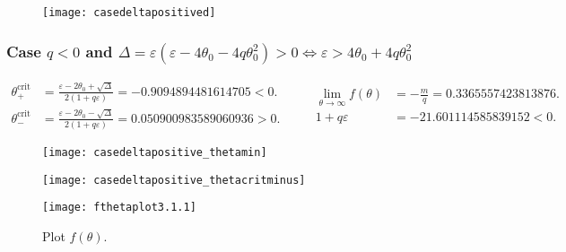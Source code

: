 \documentclass[
    8pt,
    aspectratio=1610,
    c,
    intlimits,
    leqno,
    professionalfonts,
]{beamer}
\begin{document}
\begin{frame}
	\begin{figure}[ht!]
		\centering
		\texttt{[image: casedeltapositived]}
	\end{figure}
\end{frame}

\begin{frame}
	\frametitle{Case $q<0$ and
		\begin{math}
			\Delta=
			\varepsilon\left(\varepsilon-4\theta_{0}-4q\theta^{2}_{0}\right)>
			0\iff\varepsilon>4\theta_{0}+4q\theta^{2}_{0}
		\end{math}
	}

	\begin{equation*}
		\begin{aligned}
			\theta^{\text{crit}}_{+} & =
			\frac{
				\varepsilon-2\theta_{0}+\sqrt{\Delta}
			}{
				2\left(1+q\varepsilon\right)
			}=
			-0.9094894481614705<
			0.                           \\
			\theta^{\text{crit}}_{-} & =
			\frac{
				\varepsilon-2\theta_{0}-\sqrt{\Delta}
			}{
				2\left(1+q\varepsilon\right)
			}=
			0.050900983589060936
			>0.
		\end{aligned}\qquad
		\begin{aligned}
			\lim_{\theta\to\infty}f\left(\theta\right) & =
			-\frac{m}{q}=
			0.3365557423813876.                            \\
			1+q\varepsilon                             & =
			-21.601114585839152<0.
		\end{aligned}
	\end{equation*}
\end{frame}

\begin{frame}
	\begin{figure}[ht!]
		\centering
		\texttt{[image: casedeltapositive\_thetamin]}
	\end{figure}
\end{frame}

\begin{frame}
	\begin{figure}[ht!]
		\centering
		\texttt{[image: casedeltapositive\_thetacritminus]}
	\end{figure}
\end{frame}

\begin{frame}
	\begin{figure}[ht!]
		\centering
		\texttt{[image: fthetaplot3.1.1]}
		\caption{Plot $f\left(\theta\right)$.}
	\end{figure}
\end{frame}
\end{document}
